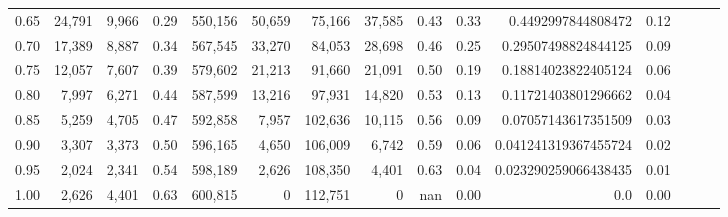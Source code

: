 \begin{tabular}{rrrrrrrrrrrrrrr}
0.65 &  24,791 &   9,966 &  0.29 &  550,156 &   50,659 &   75,166 &   37,585 &  0.43 &  0.33 &    0.4492997844808472 &      0.12 \\
0.70 &  17,389 &   8,887 &  0.34 &  567,545 &   33,270 &   84,053 &   28,698 &  0.46 &  0.25 &   0.29507498824844125 &      0.09 \\
0.75 &  12,057 &   7,607 &  0.39 &  579,602 &   21,213 &   91,660 &   21,091 &  0.50 &  0.19 &   0.18814023822405124 &      0.06 \\
0.80 &   7,997 &   6,271 &  0.44 &  587,599 &   13,216 &   97,931 &   14,820 &  0.53 &  0.13 &   0.11721403801296662 &      0.04 \\
0.85 &   5,259 &   4,705 &  0.47 &  592,858 &    7,957 &  102,636 &   10,115 &  0.56 &  0.09 &   0.07057143617351509 &      0.03 \\
0.90 &   3,307 &   3,373 &  0.50 &  596,165 &    4,650 &  106,009 &    6,742 &  0.59 &  0.06 &  0.041241319367455724 &      0.02 \\
0.95 &   2,024 &   2,341 &  0.54 &  598,189 &    2,626 &  108,350 &    4,401 &  0.63 &  0.04 &  0.023290259066438435 &      0.01 \\
1.00 &   2,626 &   4,401 &  0.63 &  600,815 &        0 &  112,751 &        0 &   nan &  0.00 &                   0.0 &      0.00 \\
\bottomrule
\end{tabular}
